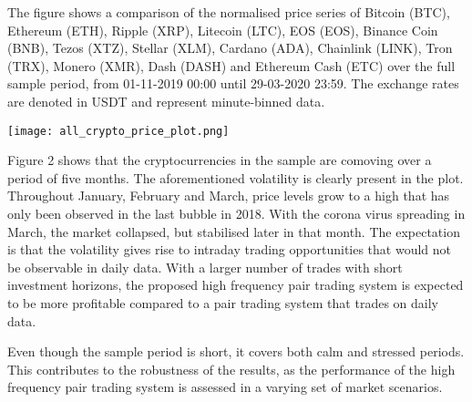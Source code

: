 \documentclass[12pt,english,authoryear]{article}
\begin{document}
\begin{center}
\begin{minipage}{\textwidth}
\caption*{\footnotesize The figure shows a comparison of the normalised price series of Bitcoin (BTC), Ethereum (ETH), Ripple (XRP), Litecoin (LTC), EOS (EOS), Binance Coin (BNB), Tezos (XTZ), Stellar (XLM), Cardano (ADA), Chainlink (LINK), Tron (TRX), Monero (XMR), Dash (DASH) and Ethereum Cash (ETC) over the full sample period, from 01-11-2019 00:00 until 29-03-2020 23:59. The exchange rates are denoted in USDT and represent minute-binned data.}
\texttt{[image: all\_crypto\_price\_plot.png]}
\end{minipage}
\end{center}

Figure 2 shows that the cryptocurrencies in the sample are comoving over a period of five months. The aforementioned volatility is clearly present in the plot. Throughout January, February and March, price levels grow to a high that has only been observed in the last bubble in 2018. With the corona virus spreading in March, the market collapsed, but stabilised later in that month. The expectation is that the volatility gives rise to intraday trading opportunities that would not be observable in daily data. With a larger number of trades with short investment horizons, the proposed high frequency pair trading system is expected to be more profitable compared to a pair trading system that trades on daily data.  

Even though the sample period is short, it covers both calm and stressed periods. This contributes to the robustness of the results, as the performance of the high frequency pair trading system is assessed in a varying set of market scenarios. 

\end{document}
